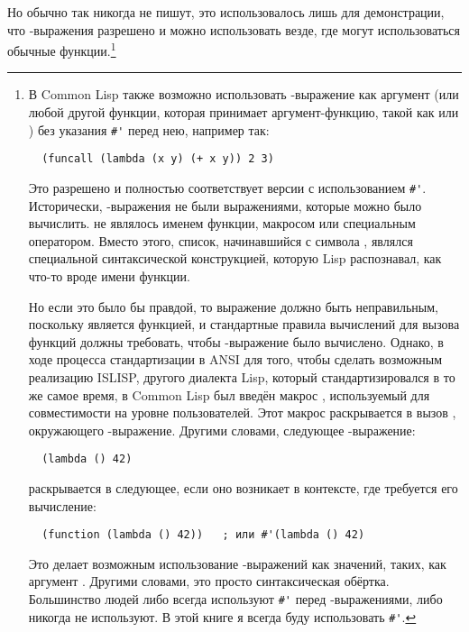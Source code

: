   Но обычно так никогда не пишут, это использовалось лишь для демонстрации, что
  -выражения разрешено и можно использовать везде, где могут использоваться
  обычные функции.\footnote{В Common Lisp также возможно использовать
    -выражение как аргумент  (или любой другой функции, которая
    принимает аргумент-функцию, такой как  или ) без указания
    \lstinline!#'! перед нею, например так:

\begin{lstlisting}
  (funcall (lambda (x y) (+ x y)) 2 3)
\end{lstlisting}

Это разрешено и полностью соответствует версии с использованием \lstinline!#'!.  Исторически,
-выражения не были выражениями, которые можно было вычислить.  
не являлось именем функции, макросом или специальным оператором.  Вместо этого, список,
начинавшийся с символа , являлся специальной синтаксической конструкцией,
которую Lisp распознавал, как что-то вроде имени функции.

Но если это было бы правдой, то выражение  должно быть
неправильным, поскольку  является функцией, и стандартные правила вычислений
для вызова функций должны требовать, чтобы -выражение было вычислено.
Однако, в ходе процесса стандартизации в ANSI для того, чтобы сделать возможным реализацию
ISLISP, другого диалекта Lisp, который стандартизировался в то же самое время, в Common
Lisp был введён макрос , используемый для совместимости на уровне
пользователей.  Этот макрос раскрывается в вызов , окружающего
-выражение.  Другими словами, следующее -выражение:

\begin{lstlisting}
  (lambda () 42)
\end{lstlisting}

раскрывается в следующее, если оно возникает в контексте, где требуется его вычисление:

\begin{lstlisting}
  (function (lambda () 42))   ; или #'(lambda () 42)
\end{lstlisting}

Это делает возможным использование -выражений как значений, таких, как
аргумент .  Другими словами, это просто синтаксическая обёртка.  Большинство
людей либо всегда используют \lstinline!#'! перед -выражениями, либо никогда
не используют.  В этой книге я всегда буду использовать \lstinline!#'!.}

